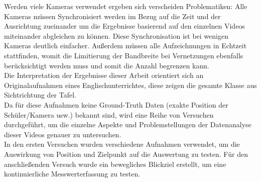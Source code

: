 Werden viele Kameras verwendet ergeben sich verscheiden Problematiken: Alle Kameras müssen Synchronisiert werden im Bezug auf die Zeit und der Ausrichtung zueinander um die Ergebnisse basierend auf den einzelnen Videos miteinander abgleichen zu können. Diese Synchronisation ist bei wenigen Kameras deutlich einfacher. Außerdem müssen alle Aufzeichnungen in Echtzeit stattfinden, womit die Limitierung der Bandbreite bei Vernetzungen ebenfalls berücksichtigt werden muss und somit die Anzahl begrenzen kann.\\
Die Interpretation der Ergebnisse dieser Arbeit orientiert sich an Originalaufnahmen eines Englischunterrichtes, diese zeigen die gesamte Klasse aus Sichtrichtung der Tafel.\\
Da für diese Aufnahmen keine Ground-Truth Daten (exakte Position der Schüler/Kamera usw.) bekannt sind, wird eine Reihe von Versuchen durchgeführt, um die einzelne Aspekte und Problemstellungen der Datenanalyse dieser Videos genauer zu untersuchen.\\
In den ersten Versuchen wurden verschiedene Aufnahmen verwendet, um die Auswirkung von Position und Zielpunkt auf die Auswertung zu testen. Für den anschließenden Versuch wurde ein bewegliches Blickziel erstellt, um eine kontinuierliche Messwerterfassung zu testen.